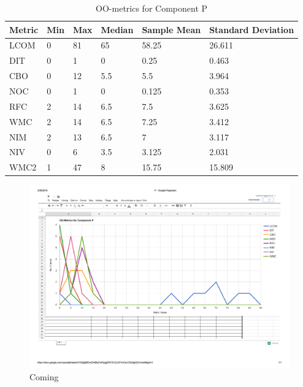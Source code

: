 \begin{table}[]
\centering
\caption{OO-metrics for Component P}
\label{tab:oometrics-proc}
\begin{tabular}{|l|l|l|l|l|l|}
\hline
\textbf{Metric} & \textbf{Min} & \textbf{Max} & \textbf{Median} & \textbf{Sample Mean} & \textbf{Standard Deviation} \\ \hline
LCOM            & 0            & 81           & 65              & 58.25                & 26.611                      \\ \hline
DIT             & 0            & 1            & 0               & 0.25                 & 0.463                       \\ \hline
CBO             & 0            & 12           & 5.5             & 5.5                  & 3.964                       \\ \hline
NOC             & 0            & 1            & 0               & 0.125                & 0.353                       \\ \hline
RFC             & 2            & 14           & 6.5             & 7.5                  & 3.625                       \\ \hline
WMC             & 2            & 14           & 6.5             & 7.25                 & 3.412                       \\ \hline
NIM             & 2            & 13           & 6.5             & 7                    & 3.117                       \\ \hline
NIV             & 0            & 6            & 3.5             & 3.125                & 2.031                       \\ \hline
WMC2            & 1            & 47           & 8               & 15.75                & 15.809                      \\ \hline
\end{tabular}
\end{table}



\begin{landscape}
\setlength\LTleft{-.5in}
	\begin{figure}
	\centering
	\includegraphics[width=\textwidth]{images/process.pdf}
	\caption{Coming}
	\label{fig:procgraph}
	\end{figure}
\end{landscape}



